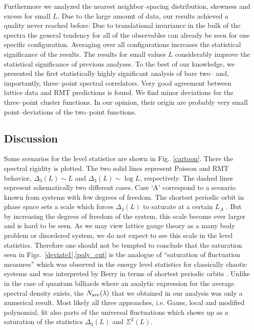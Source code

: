 Furthermore we analyzed the nearest neighbor--spacing distribution,
skewness and excess for small $L$. Due to the large amount of data,
our results achieved a quality never reached before.  Due to
translational invariance in the bulk of the spectra the general
tendency for all of the observables can already be seen for one
specific configuration.  Averaging over all configurations increases
the statistical significance of the results.  The results for small
values $L$ considerably improve the statistical significance of
previous analyses\cite{halasz95,halasz97}.  To the best of our
knowledge, we presented the first statistically highly significant
analysis of bare two-- and, importantly, three--point spectral
correlators. Very good agreement between lattice data and RMT
predictions is found.  We find minor deviations for the three--point
cluster functions. In our opinion, their origin are probably very
small point--deviations of the two--point functions.

\subsection{Discussion}
\label{sec42}

Some scenarios for the level statistics are shown in
Fig.~\ref{cartoon}.  There the spectral rigidity is plotted. The two
solid lines represent Poisson and RMT behavior, $\Delta_3(L)\sim L$
and $\Delta_3(L)\sim\log L$, respectively. The dashed lines represent
schematically two different cases.  Case `A' correspond to a scenario
known from systems with few degrees of freedom. The shortest periodic
orbit in phase space sets a scale which forces $\Delta_3(L)$ to
saturate at a certain $L_A$ \cite{berry85}. But by increasing the
degrees of freedom of the system, this scale become ever larger and is
hard to be seen.  As we may view lattice gauge theory as a many body
problem or disordered system, we do not expect to see this scale in
the level statistics.  Therefore one should not be tempted to conclude
that the saturation seen in Figs.~\ref{deviate1},\ref{poly_cut} is the
analogue of ``saturation of fluctuation measures'' which was observed
in the energy level statistics for classically chaotic systems and was
interpreted by Berry in terms of shortest periodic orbits
\cite{berry85}.  Unlike in the case of quantum billiards where an
analytic expression for the average spectral density exists, the
$N_{\rm ave}(\lambda)$ that we obtained in our analysis was only a
numerical result. Most likely all three approaches, i.e.  Gauss, local
and modified polynomial, fit also parts of the universal fluctuations
which shows up as a saturation of the statistics $\Delta_3(L)$ and
$\Sigma^2(L)$.


